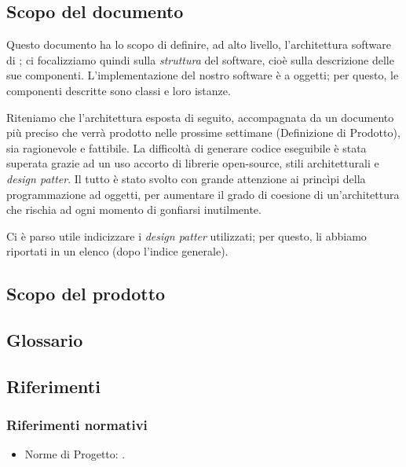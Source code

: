 
\subsection{Scopo del documento}
Questo documento ha lo scopo di definire, ad alto livello, l'architettura software di \proj; ci focalizziamo quindi sulla \emph{struttura} del software, cioè sulla descrizione delle sue componenti. L'implementazione del nostro software è a oggetti; per questo, le componenti descritte sono classi e loro istanze.

Riteniamo che l'architettura esposta di seguito, accompagnata da un documento più preciso che verrà prodotto nelle prossime settimane (Definizione di Prodotto), sia ragionevole e fattibile. La difficoltà di generare codice eseguibile è stata superata grazie ad un uso accorto di librerie open-source, stili architetturali e \emph{design patter}. Il tutto è stato svolto con grande attenzione ai princìpi della programmazione ad oggetti, per aumentare il grado di coesione di un'architettura che rischia ad ogni momento di gonfiarsi inutilmente.

Ci è parso utile indicizzare i \emph{design patter} utilizzati; per questo, li abbiamo riportati in un elenco (dopo l'indice generale).

\subsection{Scopo del prodotto}
\scopo

\subsection{Glossario}
\presgloss

\subsection{Riferimenti} \label{sec:ref}

\subsubsection{Riferimenti normativi}
\begin{itemize}
	\item Norme di Progetto: \NdP.
\end{itemize}

